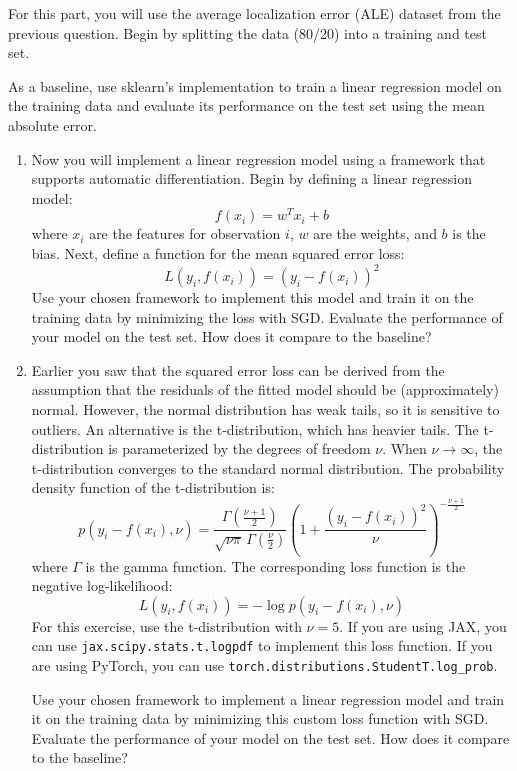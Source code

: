 \documentclass{article}
\newcounter{question}
\newcounter{exercise}
\begin{document}
\addtocounter{exercise}{-1}
\begin{exercise}[Regression]
  For this part, you will use the average localization error (ALE) dataset from the previous question. Begin by splitting the data (80/20) into a training and test set.

  As a baseline, use sklearn's implementation to train a linear regression model on the training data and evaluate its performance on the test set using the mean absolute error.
  \begin{enumerate}[label=(\alph*)]
    \item Now you will implement a linear regression model using a framework that supports automatic differentiation. Begin by defining a linear regression model:
      \[
        f(x_i) = w^T x_i + b
      \]
      where $x_i$ are the features for observation $i$, $w$ are the weights, and $b$ is the bias. Next, define a function for the mean squared error loss:
      \[
        L(y_i, f(x_i)) = (y_i - f(x_i))^2
      \]
      Use your chosen framework to implement this model and train it on the training data by minimizing the loss with SGD. Evaluate the performance of your model on the test set. How does it compare to the baseline?
    \item Earlier you saw that the squared error loss can be derived from the assumption that the residuals of the fitted model should be (approximately) normal. However, the normal distribution has weak tails, so it is sensitive to outliers. An alternative is the t-distribution, which has heavier tails. The t-distribution is parameterized by the degrees of freedom $\nu$. When $\nu \to \infty$, the t-distribution converges to the standard normal distribution. The probability density function of the t-distribution is:
      \[
        p(y_i - f(x_i), \nu) = \frac{\Gamma\left(\frac{\nu+1}{2}\right)}{\sqrt{\nu\pi}\,\Gamma\left(\frac{\nu}{2}\right)} \left(1 + \frac{(y_i - f(x_i))^2}{\nu}\right)^{-\frac{\nu+1}{2}}
      \]
      where $\Gamma$ is the gamma function. The corresponding loss function is the negative log-likelihood:
      \[
        L(y_i, f(x_i)) = -\log p(y_i - f(x_i), \nu)
      \]
      For this exercise, use the t-distribution with $\nu = 5$. If you are using JAX, you can use \texttt{jax.scipy.stats.t.logpdf} to implement this loss function. If you are using PyTorch, you can use \texttt{torch.distributions.StudentT.log\_prob}.

      Use your chosen framework to implement a linear regression model and train it on the training data by minimizing this custom loss function with SGD. Evaluate the performance of your model on the test set. How does it compare to the baseline?
  \end{enumerate}
\end{exercise}
\end{document}
